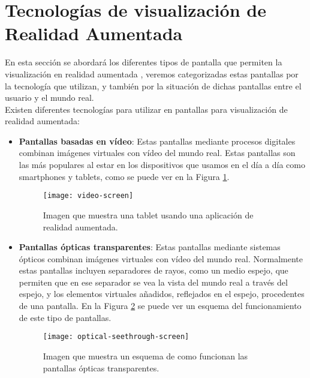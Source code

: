 \section{Tecnologías de visualización de Realidad Aumentada}
En esta sección se abordará los diferentes tipos de pantalla que permiten la visualización en realidad aumentada \cite{billinghurst}, veremos categorizadas estas pantallas por la tecnología que utilizan, y también por la situación de dichas pantallas entre el usuario y el mundo real.\\

Existen diferentes tecnologías para utilizar en pantallas para visualización de realidad aumentada:
\begin{itemize}
  \item \textbf{Pantallas basadas en vídeo}: Estas pantallas mediante procesos digitales combinan imágenes virtuales con vídeo del mundo real. Estas pantallas son las más populares al estar en los dispositivos que usamos en el día a día como smartphones y tablets, como se puede ver en la Figura \ref{figura-pantalla-video}.

  \begin{figure}[h]
    \centering
    \texttt{[image: video-screen]}
    \caption{Imagen que muestra una tablet usando una aplicación de realidad aumentada.\protect\footnotemark}
    \label{figura-pantalla-video}
  \end{figure}



  \item \textbf{Pantallas ópticas transparentes}: Estas pantallas mediante sistemas ópticos combinan imágenes virtuales con vídeo del mundo real. Normalmente estas pantallas incluyen separadores de rayos, como un medio espejo, que permiten que en ese separador se vea la vista del mundo real a través del espejo, y los elementos virtuales añadidos, reflejados en el espejo, procedentes de una pantalla. En la Figura \ref{figura-pantalla-optica} se puede ver un esquema del funcionamiento de este tipo de pantallas.

  \begin{figure}[h]
    \centering
    \texttt{[image: optical-seethrough-screen]}
    \caption{Imagen que muestra un esquema de como funcionan las pantallas ópticas transparentes.\protect\footnotemark}
    \label{figura-pantalla-optica}
  \end{figure}


\end{itemize}
